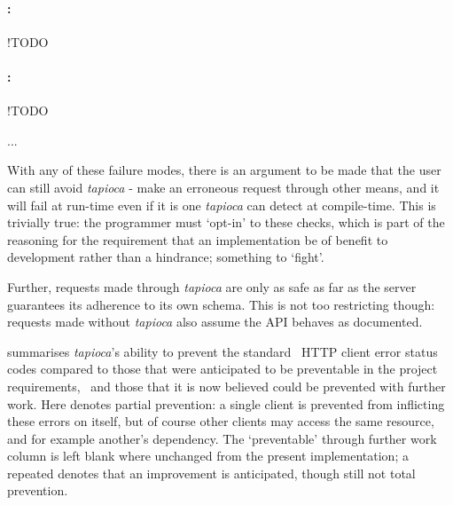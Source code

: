 \paragraph{:} !TODO
\paragraph{:} !TODO

...

With any of these failure modes, there is an argument to be made that the user can still avoid \emph{tapioca} - make an erroneous request through other means, and it will fail at run-time even if it is one \emph{tapioca} can detect at compile-time. This is trivially true: the programmer must `opt-in' to these checks, which is part of the reasoning for the requirement that an implementation be of benefit to development rather than a hindrance; something to `fight'.

Further, requests made through \emph{tapioca} are only as safe as far as the server guarantees its adherence to its own schema. This is not too restricting though: requests made without \emph{tapioca} also assume the API behaves as documented.

 summarises \emph{tapioca}'s ability to prevent the standard~\cite{rfc7231} HTTP client error status codes compared to those that were anticipated to be preventable in the project requirements,~ and those that it is now believed could be prevented with further work. Here \hmark\; denotes partial prevention: a single client is prevented from inflicting these errors on itself, but of course other clients may access the same resource, and for example  another's dependency. The `preventable' through further work column is left blank where unchanged from the present implementation; a repeated \hmark\; denotes that an improvement is anticipated, though still not total prevention.

